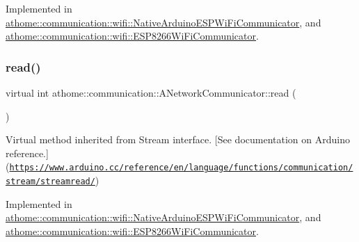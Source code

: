 Implemented in \mbox{\hyperlink{classathome_1_1communication_1_1wifi_1_1_native_arduino_e_s_p_wi_fi_communicator_adaa14eb4aa1b147531742c9377aa8db0}{athome\+::communication\+::wifi\+::\+Native\+Arduino\+E\+S\+P\+Wi\+Fi\+Communicator}}, and \mbox{\hyperlink{classathome_1_1communication_1_1wifi_1_1_e_s_p8266_wi_fi_communicator_affeb5491ad5c97fa53a683926f8184d2}{athome\+::communication\+::wifi\+::\+E\+S\+P8266\+Wi\+Fi\+Communicator}}.

\mbox{\label{classathome_1_1communication_1_1_a_network_communicator_a88d3c4366daf48865ab48b22eb62d610}} 
\subsubsection{\texorpdfstring{read()}{read()}}
{\footnotesize\ttfamily virtual int athome\+::communication\+::\+A\+Network\+Communicator\+::read (\begin{DoxyParamCaption}{ }\end{DoxyParamCaption})\hspace{0.3cm}{\ttfamily [pure virtual]}}

Virtual method inherited from Stream interface. \mbox{[}See documentation on Arduino reference.\mbox{]}(\href{https://www.arduino.cc/reference/en/language/functions/communication/stream/streamread/}{\tt https\+://www.\+arduino.\+cc/reference/en/language/functions/communication/stream/streamread/}) 

Implemented in \mbox{\hyperlink{classathome_1_1communication_1_1wifi_1_1_native_arduino_e_s_p_wi_fi_communicator_a07da3b2bf99edad18fb95b6879dbf0f7}{athome\+::communication\+::wifi\+::\+Native\+Arduino\+E\+S\+P\+Wi\+Fi\+Communicator}}, and \mbox{\hyperlink{classathome_1_1communication_1_1wifi_1_1_e_s_p8266_wi_fi_communicator_a1cadc570e912c164279ef0ebc5b178a5}{athome\+::communication\+::wifi\+::\+E\+S\+P8266\+Wi\+Fi\+Communicator}}.

\mbox{\label{classathome_1_1communication_1_1_a_network_communicator_a2c19d9918fc1d85d1768bfd0ae0bd4d4}} 
